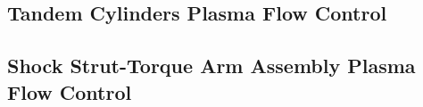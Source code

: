 \subsection{Tandem Cylinders Plasma Flow Control}

\subsection{Shock Strut-Torque Arm Assembly Plasma Flow Control}

%
%
